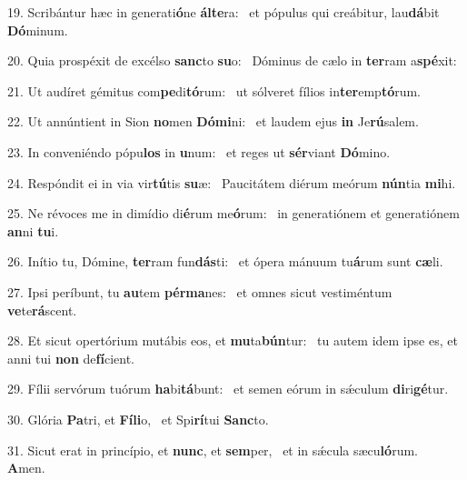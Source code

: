 19. Scribántur hæc in generati\textbf{ó}ne \textbf{ál}\textbf{te}ra: \ast\  et pópulus qui creábitur, lau\textbf{dá}bit \textbf{Dó}minum.\

20. Quia prospéxit de excélso \textbf{sanc}to \textbf{su}o: \ast\  Dóminus de cælo in \textbf{ter}ram a\textbf{spé}xit:\

21. Ut audíret gémitus com\textbf{pe}di\textbf{tó}rum: \ast\  ut sólveret fílios in\textbf{ter}emp\textbf{tó}rum.\

22. Ut annúntient in Sion \textbf{no}men \textbf{Dó}\textbf{mi}ni: \ast\  et laudem ejus \textbf{in} Je\textbf{rú}salem.\

23. In conveniéndo pópu\textbf{los} in \textbf{u}num: \ast\  et reges ut \textbf{sér}viant \textbf{Dó}mino.\

24. Respóndit ei in via vir\textbf{tú}tis \textbf{su}æ: \ast\  Paucitátem diérum meórum \textbf{nún}tia \textbf{mi}hi.\

25. Ne révoces me in dimídio di\textbf{é}rum me\textbf{ó}rum: \ast\  in generatiónem et generatiónem \textbf{an}ni \textbf{tu}i.\

26. Inítio tu, Dómine, \textbf{ter}ram fun\textbf{dás}ti: \ast\  et ópera mánuum tu\textbf{á}rum sunt \textbf{cæ}li.\

27. Ipsi períbunt, tu \textbf{au}tem \textbf{pér}\textbf{ma}nes: \ast\  et omnes sicut vestiméntum \textbf{ve}te\textbf{rá}scent.\

28. Et sicut opertórium mutábis eos, et \textbf{mu}ta\textbf{bún}tur: \ast\  tu autem idem ipse es, et anni tui \textbf{non} de\textbf{fí}cient.\

29. Fílii servórum tuórum \textbf{ha}bi\textbf{tá}bunt: \ast\  et semen eórum in sǽculum \textbf{di}ri\textbf{gé}tur.\

30. Glória \textbf{Pa}tri, et \textbf{Fí}\textbf{li}o, \ast\  et Spi\textbf{rí}tui \textbf{Sanc}to.\

31. Sicut erat in princípio, et \textbf{nunc}, et \textbf{sem}per, \ast\  et in sǽcula sæcu\textbf{ló}rum. \textbf{A}men.\

